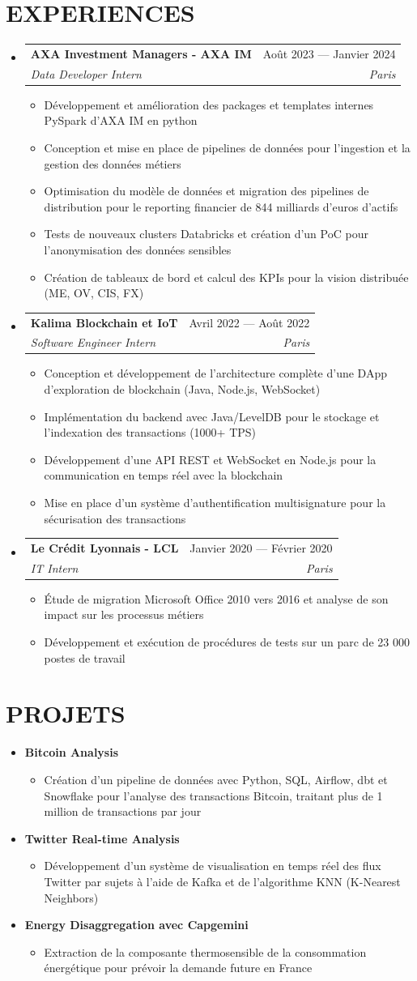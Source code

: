\documentclass[11pt,a4paper]{article}
\makeatletter
\newcommand{\resumeItem}[1]{
  \item\footnotesize{
    {#1 \vspace{-1pt}}
  }
}
\newcommand{\resumeSubheading}[4]{
  \vspace{2pt}\item
    \begin{tabular*}{\textwidth}[t]{l@{\extracolsep{\fill}}r}
      {\footnotesize\textbf{#1}} & {\footnotesize#2} \\
      {\footnotesize\textit{#3}} & {\footnotesize\textit{#4}} \\
    \end{tabular*}\vspace{2pt}
}
\newcommand{\resumeProjectHeading}[2]{
  \item
  {\footnotesize#1} \hfill {#2}
}
\newcommand{\resumeSubHeadingListStart}{\begin{itemize}[leftmargin=0in, label={}]}
\newcommand{\resumeSubHeadingListEnd}{\end{itemize}}
\newcommand{\resumeItemListStart}{\begin{itemize}[label={\textbullet}]}
\newcommand{\resumeItemListEnd}{\end{itemize}\vspace{0pt}}
\makeatother
\begin{document}
\section{EXPERIENCES}
\resumeSubHeadingListStart
    \resumeSubheading
      {AXA Investment Managers - AXA IM}{Août 2023 --- Janvier 2024}
      {Data Developer Intern}{Paris}
      \resumeItemListStart
        \resumeItem{Développement et amélioration des packages et templates internes PySpark d'AXA IM en python}
        \resumeItem{Conception et mise en place de pipelines de données pour l'ingestion et la gestion des données métiers}
        \resumeItem{Optimisation du modèle de données et migration des pipelines de distribution pour le reporting financier de 844 milliards d'euros d'actifs}
        \resumeItem{Tests de nouveaux clusters Databricks et création d'un PoC pour l'anonymisation des données sensibles}
        \resumeItem{Création de tableaux de bord et calcul des KPIs pour la vision distribuée (ME, OV, CIS, FX)}
      \resumeItemListEnd
    \resumeSubheading
      {Kalima Blockchain et IoT}{Avril 2022 --- Août 2022}
      {Software Engineer Intern}{Paris}
      \resumeItemListStart
        \resumeItem{Conception et développement de l'architecture complète d'une DApp d'exploration de blockchain (Java, Node.js, WebSocket)}
        \resumeItem{Implémentation du backend avec Java/LevelDB pour le stockage et l'indexation des transactions (1000+ TPS)}
        \resumeItem{Développement d'une API REST et WebSocket en Node.js pour la communication en temps réel avec la blockchain}
        \resumeItem{Mise en place d'un système d'authentification multisignature pour la sécurisation des transactions}
      \resumeItemListEnd
    \resumeSubheading
      {Le Crédit Lyonnais - LCL}{Janvier 2020 --- Février 2020}
      {IT Intern}{Paris}
      \resumeItemListStart
        \resumeItem{Étude de migration Microsoft Office 2010 vers 2016 et analyse de son impact sur les processus métiers}
        \resumeItem{Développement et exécution de procédures de tests sur un parc de 23 000 postes de travail}
      \resumeItemListEnd
  \resumeSubHeadingListEnd

\section{PROJETS}
\resumeSubHeadingListStart
    \resumeProjectHeading
      {\textbf{Bitcoin Analysis}} {}
      \resumeItemListStart
        \resumeItem{Création d'un pipeline de données avec Python, SQL, Airflow, dbt et Snowflake pour l'analyse des transactions Bitcoin, traitant plus de 1 million de transactions par jour}
      \resumeItemListEnd
    \resumeProjectHeading
      {\textbf{Twitter Real-time Analysis}} {}
      \resumeItemListStart
        \resumeItem{Développement d'un système de visualisation en temps réel des flux Twitter par sujets à l'aide de Kafka et de l'algorithme KNN (K-Nearest Neighbors)}
      \resumeItemListEnd
    \resumeProjectHeading
      {\textbf{Energy Disaggregation avec Capgemini}} {}
      \resumeItemListStart
        \resumeItem{Extraction de la composante thermosensible de la consommation énergétique pour prévoir la demande future en France}
      \resumeItemListEnd
\resumeSubHeadingListEnd
\end{document}
